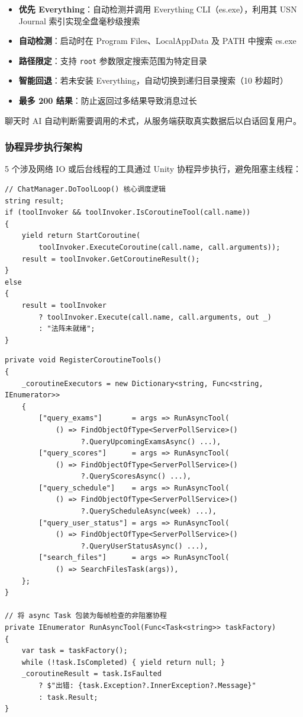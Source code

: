 \documentclass[12pt,a4paper]{ctexart}
\begin{document}
\begin{itemize}
    \item \textbf{优先 Everything}：自动检测并调用 Everything CLI（es.exe），利用其 USN Journal 索引实现全盘毫秒级搜索
    \item \textbf{自动检测}：启动时在 Program Files、LocalAppData 及 PATH 中搜索 es.exe
    \item \textbf{路径限定}：支持 \texttt{root} 参数限定搜索范围为特定目录
    \item \textbf{智能回退}：若未安装 Everything，自动切换到递归目录搜索（10 秒超时）
    \item \textbf{最多 200 结果}：防止返回过多结果导致消息过长
\end{itemize}

聊天时 AI 自动判断需要调用的术式，从服务端获取真实数据后以白话回复用户。

\subsubsection{协程异步执行架构}

5 个涉及网络 IO 或后台线程的工具通过 Unity 协程异步执行，避免阻塞主线程：

\begin{lstlisting}[style=csharp,caption={ChatManager.DoToolLoop 协程调度},label={lst:coroutine-dispatch}]
// ChatManager.DoToolLoop() 核心调度逻辑
string result;
if (toolInvoker && toolInvoker.IsCoroutineTool(call.name))
{
    yield return StartCoroutine(
        toolInvoker.ExecuteCoroutine(call.name, call.arguments));
    result = toolInvoker.GetCoroutineResult();
}
else
{
    result = toolInvoker
        ? toolInvoker.Execute(call.name, call.arguments, out _)
        : "法阵未就绪";
}
\end{lstlisting}

\begin{lstlisting}[style=csharp,caption={ToolCallInvoker 协程工具注册与 RunAsyncTool},label={lst:coroutine-tools}]
private void RegisterCoroutineTools()
{
    _coroutineExecutors = new Dictionary<string, Func<string, IEnumerator>>
    {
        ["query_exams"]       = args => RunAsyncTool(
            () => FindObjectOfType<ServerPollService>()
                  ?.QueryUpcomingExamsAsync() ...),
        ["query_scores"]      = args => RunAsyncTool(
            () => FindObjectOfType<ServerPollService>()
                  ?.QueryScoresAsync() ...),
        ["query_schedule"]    = args => RunAsyncTool(
            () => FindObjectOfType<ServerPollService>()
                  ?.QueryScheduleAsync(week) ...),
        ["query_user_status"] = args => RunAsyncTool(
            () => FindObjectOfType<ServerPollService>()
                  ?.QueryUserStatusAsync() ...),
        ["search_files"]      = args => RunAsyncTool(
            () => SearchFilesTask(args)),
    };
}

// 将 async Task 包装为每帧检查的非阻塞协程
private IEnumerator RunAsyncTool(Func<Task<string>> taskFactory)
{
    var task = taskFactory();
    while (!task.IsCompleted) { yield return null; }
    _coroutineResult = task.IsFaulted
        ? $"出错: {task.Exception?.InnerException?.Message}"
        : task.Result;
}
\end{lstlisting}
\end{document}
